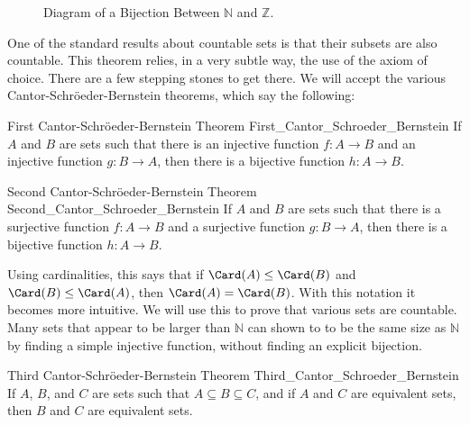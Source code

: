            \begin{figure}[H]
                \centering
                \captionsetup{type=figure}
                
                \caption{Diagram of a Bijection Between
                         $\mathbb{N}$ and $\mathbb{Z}$.}
                \label{fig:Bijection_N_and_Z}
            \end{figure}
            One of the standard results about countable sets is
            that their subsets are also countable. This theorem
            relies, in a very subtle way, the use of the axiom
            of choice. There are a few stepping stones to get
            there. We will accept the various
            Cantor-Schr\"{o}eder-Bernstein theorems, which say
            the following:
            \begin{ltheorem}
                  {First Cantor-Schr\"{o}eder-Bernstein Theorem}
                  {First_Cantor_Schroeder_Bernstein}
                If $A$ and $B$ are sets such that there is an injective
                function $f:A\rightarrow{B}$ and an injective function
                $g:B\rightarrow{A}$, then there is a bijective function
                $h:A\rightarrow{B}$.
            \end{ltheorem}
            \begin{ltheorem}
                  {Second Cantor-Schr\"{o}eder-Bernstein Theorem}
                  {Second_Cantor_Schroeder_Bernstein}
                If $A$ and $B$ are sets such that there is a surjective
                function $f:A\rightarrow{B}$ and a surjective function
                $g:B\rightarrow{A}$, then there is a bijective function
                $h:A\rightarrow{B}$.
            \end{ltheorem}
            \par\hfill\par
            Using cardinalities, this says that if
            $\Card(A)\leq\Card(B)$ and $\Card(B)\leq\Card(A)$, then
            $\Card(A)=\Card(B)$. With this notation it becomes more
            intuitive. We will use this to prove that various sets are
            countable. Many sets that appear to be larger than $\mathbb{N}$
            can shown to to be the same size as $\mathbb{N}$ by finding
            a simple injective function, without finding an explicit
            bijection.
            \begin{ltheorem}
                  {Third Cantor-Schr\"{o}eder-Bernstein Theorem}
                  {Third_Cantor_Schroeder_Bernstein}
                If $A$, $B$, and $C$ are sets such that
                $A\subseteq{B}\subseteq{C}$, and if $A$ and $C$ are equivalent
                sets, then $B$ and $C$ are equivalent sets.
            \end{ltheorem}
